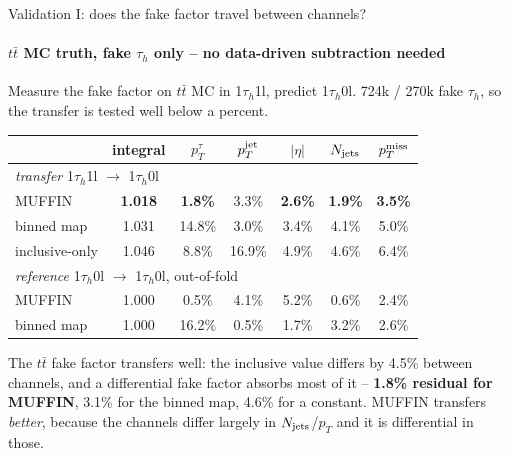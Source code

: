 \documentclass[aspectratio=169,10pt]{beamer}
\begin{document}
\begin{frame}{Validation I: does the fake factor travel between channels?}
  \framesubtitle{$t\bar t$ MC truth, fake $\tau_h$ only -- no data-driven subtraction needed}
  \small
  Measure the fake factor on $t\bar t$ MC in 1$\tau_h$1l, predict 1$\tau_h$0l.
  724k / 270k fake $\tau_h$, so the transfer is tested well below a percent.
  \vspace{0.3em}
  \begin{center}
  \begin{tabular}{lcccccc}
    \toprule
    & integral & $p_T^{\tau}$ & $p_T^{\rm jet}$ & $|\eta|$ & $N_{\rm jets}$ & $p_T^{\rm miss}$ \\
    \midrule
    \multicolumn{7}{l}{\textit{transfer} 1$\tau_h$1l $\to$ 1$\tau_h$0l} \\
    MUFFIN            & \textbf{1.018} & \textbf{1.8\%} & 3.3\% & \textbf{2.6\%} & \textbf{1.9\%} & \textbf{3.5\%} \\
    binned map        & 1.031 & 14.8\% & 3.0\% & 3.4\% & 4.1\% & 5.0\% \\
    inclusive-only    & 1.046 & 8.8\%  & 16.9\% & 4.9\% & 4.6\% & 6.4\% \\
    \midrule
    \multicolumn{7}{l}{\textit{reference} 1$\tau_h$0l $\to$ 1$\tau_h$0l, out-of-fold} \\
    MUFFIN            & 1.000 & 0.5\% & 4.1\% & 5.2\% & 0.6\% & 2.4\% \\
    binned map        & 1.000 & 16.2\% & 0.5\% & 1.7\% & 3.2\% & 2.6\% \\
    \bottomrule
  \end{tabular}
  \end{center}
  \vspace{0.3em}
  The $t\bar t$ fake factor transfers well: the inclusive value differs by 4.5\%
  between channels, and a differential fake factor absorbs most of it --
  \textbf{1.8\% residual for MUFFIN}, 3.1\% for the binned map, 4.6\% for a constant.
  MUFFIN transfers \emph{better}, because the channels differ largely in
  $N_{\rm jets}$/$p_T$ and it is differential in those.
\end{frame}
\end{document}
